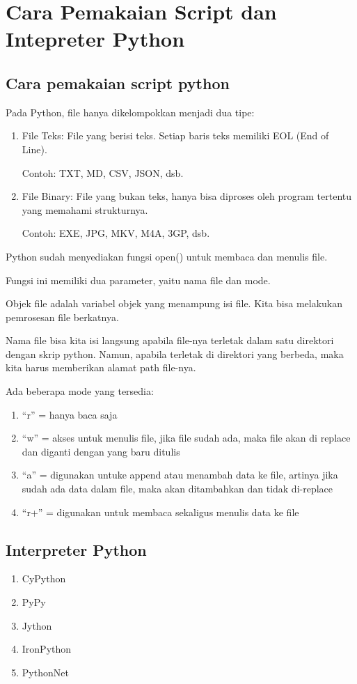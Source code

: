 \documentclass[lipt]{Article}
\begin{document}
\section{Cara Pemakaian Script dan Intepreter Python}
\subsection{Cara pemakaian script  python}

Pada Python, file hanya dikelompokkan menjadi dua tipe:

\begin{enumerate}


\item File Teks: File yang berisi teks. Setiap baris teks memiliki EOL (End of Line).

Contoh: TXT, MD, CSV, JSON, dsb.

\item File Binary: File yang bukan teks, hanya bisa diproses oleh program tertentu yang memahami strukturnya.

Contoh: EXE, JPG, MKV, M4A, 3GP, dsb.
\end{enumerate}

Python sudah menyediakan fungsi open() untuk membaca dan menulis file.

Fungsi ini memiliki dua parameter, yaitu nama file dan mode.

Objek file adalah variabel objek yang menampung isi file. Kita bisa melakukan pemrosesan file berkatnya.

Nama file bisa kita isi langsung apabila file-nya terletak dalam satu direktori dengan skrip python. Namun, apabila terletak di direktori yang berbeda, maka kita harus memberikan alamat path file-nya.

Ada beberapa mode yang tersedia:
\begin{enumerate}

\item “r”	 = hanya baca saja
\item “w”	= akses untuk menulis file, jika file sudah ada, maka file akan di replace dan diganti dengan yang baru ditulis
\item “a”	= digunakan untuke append atau menambah data ke file, artinya jika sudah ada data dalam file, maka akan ditambahkan dan tidak di-replace
\item “r+” =	digunakan untuk membaca sekaligus menulis data ke file
\end{enumerate}

\subsection{Interpreter Python}
\begin{enumerate}
\item CyPython
\item PyPy
\item Jython
\item IronPython
\item PythonNet
\end{enumerate}
\end{document}
